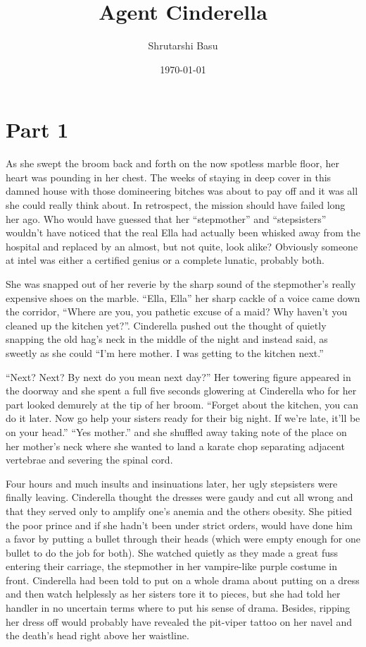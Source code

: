 \documentclass[11pt,letterpaper]{article}
\title{Agent Cinderella}
\author{Shrutarshi Basu}
\date{\today}
\begin{document}
\maketitle
\doublespacing

\section*{Part 1}

As she swept the broom back and forth on the now spotless marble floor, her heart was pounding in her chest. The weeks of staying in deep cover in this damned house with those domineering bitches was about to pay off and it was all she could really think about. In retrospect, the mission should have failed long her ago. Who would have guessed that her ``stepmother'' and ``stepsisters'' wouldn't have noticed that the real Ella had actually been whisked away from the hospital and replaced by an almost, but not quite, look alike? Obviously someone at intel was either a certified genius or a complete lunatic, probably both.

She was snapped out of her reverie by the sharp sound of the stepmother's really expensive shoes on the marble. ``Ella, Ella'' her sharp cackle of a voice came down the corridor, ``Where are you, you pathetic excuse of a maid? Why haven't you cleaned up the kitchen yet?''. Cinderella pushed out the thought of quietly snapping the old hag's neck in the middle of the night and instead said, as sweetly as she could ``I'm here mother. I was getting to the kitchen next.''

``Next? Next? By next do you mean next day?'' Her towering figure appeared in the doorway and she spent a full five seconds glowering at Cinderella who for her part looked demurely at the tip of her broom. ``Forget about the kitchen, you can do it later. Now go help your sisters ready for their big night. If we're late, it'll be on your head.'' ``Yes mother.'' and she shuffled away taking note of the place on her mother's neck where she wanted to land a karate chop separating adjacent vertebrae and severing the spinal cord.

Four hours and much insults and insinuations later, her ugly stepsisters were finally leaving. Cinderella thought the dresses were gaudy and cut all wrong and that they served only to amplify one's anemia and the others obesity. She pitied the poor prince and if she hadn't been under strict orders, would have done him a favor by putting a bullet through their heads (which were empty enough for one bullet to do the job for both). She watched quietly as they made a great fuss entering their carriage, the stepmother in her vampire-like purple costume in front. Cinderella had been told to put on a whole drama about putting on a dress and then watch helplessly as her sisters tore it to pieces, but she had told her handler in no uncertain terms where to put his sense of drama. Besides, ripping her dress off would probably have revealed the pit-viper tattoo on her navel and the death's head right above her waistline.
\end{document}
